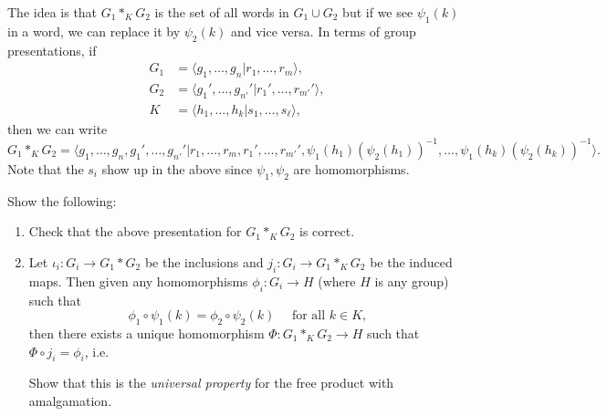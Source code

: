 \begin{remark}
  The idea is that $G_1 *_K G_2$ is the set of all
  words in $G_1 \cup G_2$ but if we see
  $\psi_1(k)$ in a word, we can replace it
  by $\psi_2(k)$ and vice versa. In terms of
  group presentations, if
  \begin{align*}
    G_1 &= \langle g_1, \dots, g_n | r_1, \dots, r_m \rangle, \\
    G_2 &= \langle g_1', \dots, g_{n'}' | r_{1}', \dots, r_{m'}' \rangle, \\
    K &= \langle h_1, \dots, h_k | s_1, \dots, s_\ell \rangle,
  \end{align*}
  then we can write
  \[
    G_1 *_K G_2 = \langle g_1, \dots, g_n, g_1', \dots, g_{n'}' | r_1, \dots, r_m, r_{1}', \dots, r_{m'}', \psi_1(h_1) (\psi_2(h_1))^{-1}, \dots, \psi_1(h_k)(\psi_2(h_k))^{-1} \rangle.
  \]
  Note that the $s_i$ show up in the above since
  $\psi_1, \psi_2$ are homomorphisms.
\end{remark}

\begin{exercise}
  Show the following:
  \begin{enumerate}
    \item Check that the above presentation for
      $G_1 *_K G_2$ is correct.
    \item Let $\iota_i : G_i \to G_1 * G_2$ be the inclusions
      and $j_i : G_i \to G_1 *_K G_2$
      be the induced maps. Then given any homomorphisms
      $\phi_i : G_i \to H$ (where $H$ is any group)
      such that
      \[
        \phi_1 \circ \psi_1(k) = \phi_2 \circ \psi_2(k)
        \quad \text{ for all } k \in K,
      \]
      then there exists a unique homomorphism
      $\Phi : G_1 *_K G_2 \to H$ such that
      $\Phi \circ j_i = \phi_i$, i.e.
      \begin{center}
      \end{center}
      Show that this
      is the \emph{universal property} for the
      free product with amalgamation.
  \end{enumerate}
\end{exercise}

